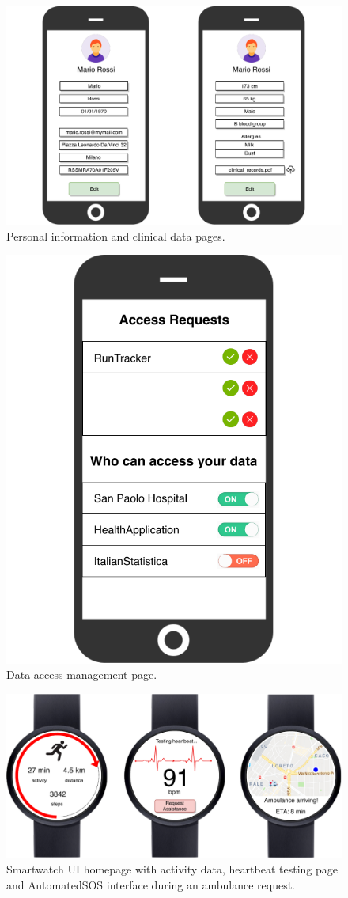 \documentclass[12pt,a4paper]{article}
\begin{document}
					\begin{figure}[H]
						\centering
						\includegraphics[width=1.0\linewidth]{Images/data-pages}
						\caption{Personal information and clinical data pages.}
						\label{fig:data-pages}
					\end{figure}
					\begin{figure}[H]
						\centering
						\includegraphics[width=0.6\linewidth]{Images/access_management}
						\caption{Data access management page.}
						\label{fig:access_management}
					\end{figure}
					\begin{figure}[H]
						\centering
						\includegraphics[width=1.0\linewidth]{Images/smartwatch}
						\caption{Smartwatch UI homepage with activity data, heartbeat testing page and AutomatedSOS interface during an ambulance request.}
						\label{fig:smartwatch}
					\end{figure}
\end{document}
